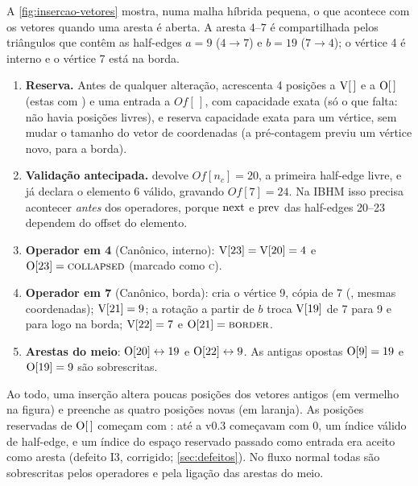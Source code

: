 A \cref{fig:insercao-vetores} mostra, numa malha híbrida pequena, o que acontece com os vetores quando uma aresta é
aberta. A aresta $4$--$7$ é compartilhada pelos triângulos que contêm as half-edges $a=9$ ($4\to7$) e $b=19$ ($7\to4$);
o vértice 4 é interno e o vértice 7 está na borda.
\begin{enumerate}
\item \textbf{Reserva.} Antes de qualquer alteração,  acrescenta 4 posições a
$\mathrm{V}[\,]$ e a $\mathrm{O}[\,]$ (estas com \BORDER) e uma entrada a $Of[\,]$, com capacidade exata (só o que falta: não havia
posições livres), e  reserva capacidade exata para um vértice, sem mudar o tamanho do
vetor de coordenadas (a pré-contagem previu um vértice novo, para a borda).
\item \textbf{Validação antecipada.}  devolve $Of[n_c]=20$, a primeira half-edge livre, e
 já declara o elemento 6 válido, gravando $Of[7]=24$. Na IBHM isso precisa acontecer \emph{antes}
dos operadores, porque $\mathrm{next}$ e $\mathrm{prev}$ das half-edges 20--23 dependem do offset do elemento.
\item \textbf{Operador em 4} (Canônico, interno): $\mathrm{V}[23]=\mathrm{V}[20]=4$ e $\mathrm{O}[23]=\textsc{collapsed}$ (marcado como \textsc{c}).
\item \textbf{Operador em 7} (Canônico, borda): cria o vértice 9, cópia de 7 (, mesmas
coordenadas); $\mathrm{V}[21]=9$; a rotação a partir de $b$ troca $\mathrm{V}[19]$ de 7 para 9 e para logo na borda; $\mathrm{V}[22]=7$ e
$\mathrm{O}[21]=\textsc{border}$.
\item \textbf{Arestas do meio}: $\mathrm{O}[20]\leftrightarrow19$ e $\mathrm{O}[22]\leftrightarrow9$. As antigas opostas $\mathrm{O}[9]=19$ e
$\mathrm{O}[19]=9$ são sobrescritas.
\end{enumerate}
Ao todo, uma inserção altera poucas posições dos vetores antigos (em vermelho na figura) e preenche as quatro posições
novas (em laranja). As posições reservadas de $\mathrm{O}[\,]$ começam com \BORDER: até a v0.3 começavam com 0, um índice
válido de half-edge, e um índice do espaço reservado passado como entrada era aceito como aresta (defeito I3, corrigido;
\cref{sec:defeitos}). No fluxo normal todas são sobrescritas pelos operadores e pela ligação das arestas do meio.

